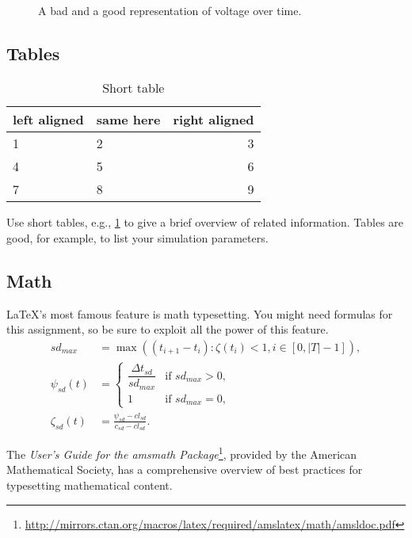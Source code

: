 \documentclass[conference]{IEEEtran}
\begin{document}
\begin{figure}[t]%
	\centering
	\\%
	\caption{A bad and a good representation of voltage over time.}%
	\label{fig:figures}%
\end{figure}

\subsection{Tables}

\begin{table}
	\centering
	\caption{Short table}
	\label{tab:shorttable}
	\begin{tabular}{llr}
		\toprule
		left aligned & same here & right aligned \\
		\midrule
		1 & 2 & 3 \\
		4 & 5 & 6 \\
		7 & 8 & 9 \\
		\bottomrule
	\end{tabular}
\end{table}

Use short tables, e.g., \cref{tab:shorttable} to give a brief overview of related information.
Tables are good, for example, to list your simulation parameters.

\subsection{Math}

\LaTeX's most famous feature is math typesetting.
You might need formulas for this assignment, so be sure to exploit all the power of this feature.
\begin{align}
sd_{max} &=
	\max\left(
		(t_{i+1} - t_i)
			: \zeta(t_i) < 1, i \in [0, |T|-1]
	\right)
,\\
\psi_{sd}(t) &=
	\begin{cases}
		\dfrac{\Delta t_{sd}}{sd_{max}}
			& \text{if $sd_{max} > 0$}, \\
		1
			& \text{if $sd_{max} = 0$},
	\end{cases}
\\
\zeta_{sd}(t) &= 
	\frac{
		\psi_{sd} - cl_{sd}
	}{
		c_{sd} - cl_{sd}
	}
.
\end{align}

The \emph{User's Guide for the amsmath Package}\footnote{\url{http://mirrors.ctan.org/macros/latex/required/amslatex/math/amsldoc.pdf}}, provided by the American Mathematical Society, has a comprehensive overview of best practices for typesetting mathematical content.
\end{document}
